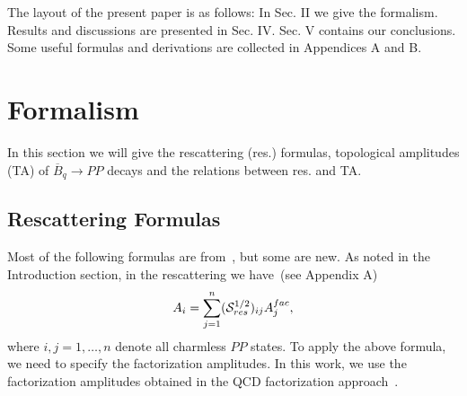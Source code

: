 \documentclass[aps,preprint,floats,epsf,epsfig,nofootinbib,letter]{revtex4}
\newcommand{\be}{\begin{eqnarray}}
\newcommand{\en}{\end{eqnarray}}
\newcommand{\ov}{\overline}
\newcommand{\Sc}{{\cal S}}
\begin{document}
The layout of the present paper is as follows: In Sec. II we
give the formalism. Results and discussions are presented in
Sec. IV. Sec. V contains our conclusions. Some useful formulas and derivations are collected in
Appendices A and B.






\section{Formalism}

In this section we will give the rescattering (res.) formulas, topological amplitudes (TA) of $\ov B{}_q\to PP$ decays and the relations between res. and TA.


\subsection{Rescattering Formulas}

Most of the following formulas are from~\cite{Chua:2007cm}, but some are new.
As noted in the Introduction section, in the rescattering we have~(see Appendix A)
 \be
 A_i=\sum_{j=1}^n(\Sc_{res}^{1/2})_{ij} A^{fac}_j,
 \label{eq:master1}
 \en
where %
$i,j=1,\dots,n$ denote all charmless
$PP$ states. To apply the above formula, we need to specify the factorization
amplitudes. In this work, we use the factorization amplitudes
obtained in the QCD factorization approach~\cite{Beneke:2003zv}.
\end{document}
